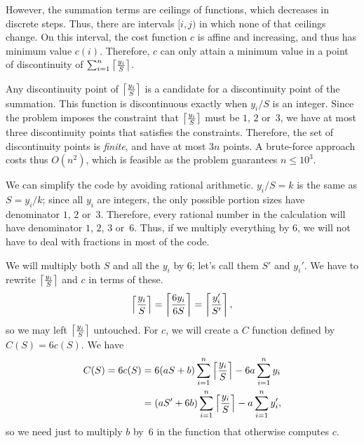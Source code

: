 \documentclass{article}
\begin{document}
However, the summation terms are ceilings of functions,
which decreases in discrete steps.
Thus, there are intervals $[i, j)$
in which none of that ceilings change.
On this interval, the cost function $c$ is affine and increasing,
and thus has minimum value $c(i)$.
Therefore, $c$ can only attain a minimum value
in a point of discontinuity of $\sum_{i=1}^n \left\lceil \frac{y_i}{S} \right\rceil$.

Any discontinuity point of $\left\lceil \frac{y_i}{S} \right\rceil$
is a candidate for a discontinuity point of the summation.
This function is discontinuous exactly when $y_i/S$ is an integer.
Since the problem imposes the constraint that $\left\lceil \frac{y_i}{S} \right\rceil$
must be $1$, $2$ or~$3$,
we have at most three discontinuity points that satisfies the constraints.
Therefore, the set of discontinuity points is \emph{finite},
and have at most $3n$ points.
A brute-force approach costs thus $O(n^2)$,
which is feasible as the problem guarantees $n \leq 10^3$.

We can simplify the code by avoiding rational arithmetic.
$y_i/S = k$ is the same as $S = y_i/k$;
since all $y_i$ are integers,
the only possible portion sizes have denominator $1$, $2$ or~$3$.
Therefore, every rational number in the calculation
will have denominator $1$, $2$, $3$ or~$6$.
Thus, if we multiply everything by $6$,
we will not have to deal with fractions in most of the code.

We will multiply both $S$ and all the $y_i$ by $6$;
let's call them $S'$ and $y_i'$.
We have to rewrite $\left\lceil \frac{y_i}{S} \right\rceil$ and $c$ in terms of these.
\begin{equation*}
    \left\lceil \frac{y_i}{S} \right\rceil = \left\lceil \frac{6 y_i}{6 S} \right\rceil
        = \left\lceil \frac{y_i'}{S'} \right\rceil,
\end{equation*}
so we may left $\left\lceil \frac{y_i}{S} \right\rceil$ untouched.
For $c$, we will create a $C$ function defined by $C(S) = 6c(S)$.
We have
\begin{align*}
    C(S) = 6c(S) &= 6(aS+b)\sum_{i=1}^n \left\lceil \frac{y_i}{S} \right\rceil - 6a \sum_{i=1}^n y_i \\
        &= (aS'+6b)\sum_{i=1}^n \left\lceil \frac{y_i}{S} \right\rceil - a \sum_{i=1}^n y_i',
\end{align*}
so we need just to multiply $b$ by~$6$
in the function that otherwise computes $c$.
\end{document}
